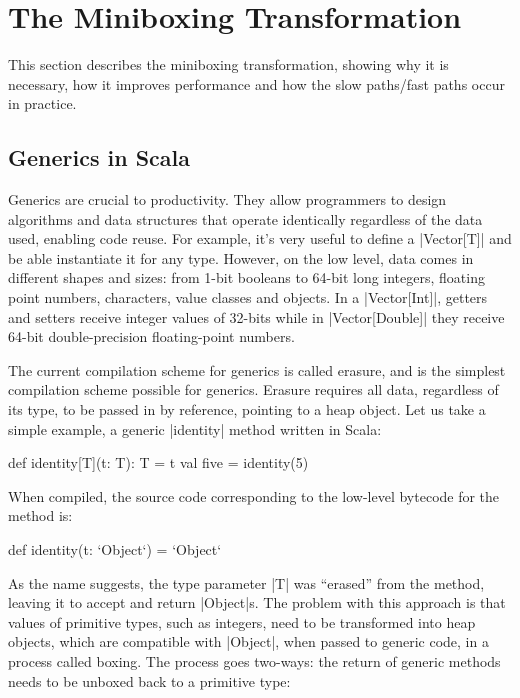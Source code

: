 \section{The Miniboxing Transformation}
\label{sec:minibox}

This section describes the miniboxing transformation, showing why it is necessary, how it improves performance and how the slow paths/fast paths occur in practice.

\subsection{Generics in Scala}

Generics are crucial to productivity. They allow programmers to design algorithms and data structures that operate identically regardless of the data used, enabling code reuse. For example, it's very useful to define a |Vector[T]| and be able instantiate it for any type. However, on the low level, data comes in different shapes and sizes: from 1-bit booleans to 64-bit long integers, floating point numbers, characters, value classes \cite{gosling-value-classes,rose-value-classes-tearing,sip-value-classes} and objects. In a |Vector[Int]|, getters and setters receive integer values of 32-bits while in |Vector[Double]| they receive 64-bit double-precision floating-point numbers.

The current compilation scheme for generics is called erasure, and is the simplest compilation scheme possible for generics. Erasure requires all data, regardless of its type, to be passed in by reference, pointing to a heap object. Let us take a simple example, a generic |identity| method written in Scala:

\begin{lstlisting-nobreak}
 def identity[T](t: T): T = t
 val five = identity(5)
\end{lstlisting-nobreak}

When compiled, the source code corresponding to the low-level bytecode for the method is:

\begin{lstlisting-nobreak}
 def identity(t: `Object`) = `Object`
\end{lstlisting-nobreak}

As the name suggests, the type parameter |T| was ``erased'' from the method, leaving it to accept and return |Object|s. The problem with this approach is that values of primitive types, such as integers, need to be transformed into heap objects, which are compatible with |Object|, when passed to generic code, in a process called boxing. The process goes two-ways: the return of generic methods needs to be unboxed back to a primitive type:

